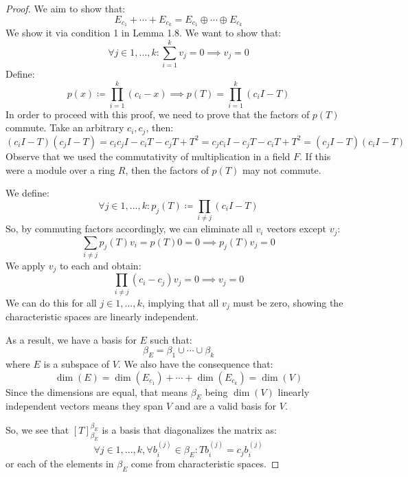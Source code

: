 \documentclass[10pt,letterpaper]{article} %
\begin{document}
\begin{proof}
We aim to show that:
\begin{equation*}
E_{c_1} + \cdots + E_{c_k} = E_{c_1} \oplus \cdots \oplus E_{c_k}
\end{equation*}
We show it via condition 1 in Lemma 1.8. We want to show that:
\begin{equation*}
\forall j \in 1, ..., k: \sum_{i=1}^k v_j = 0 \implies v_j = 0
\end{equation*}
Define:
\begin{equation*}
p(x) \coloneq \prod_{i=1}^{k}(c_i - x) \implies p(T) = \prod_{i=1}^{k}(c_iI - T)
\end{equation*}
In order to proceed with this proof, we need to prove that the factors of $p(T)$ commute. Take an arbitrary $c_i, c_j$, then:
\begin{equation*}
(c_iI - T)(c_jI - T) = c_ic_jI - c_iT - c_jT + T^2 = c_jc_iI - c_jT - c_iT + T^2 = (c_jI - T)(c_iI - T)
\end{equation*}
Observe that we used the commutativity of multiplication in a field $F$. If this were a module over a ring $R$, then the factors of $p(T)$ may not commute.

We define:
\begin{equation*}
\forall j \in 1, ..., k: p_j(T) \coloneq \prod_{i \neq j}(c_iI - T)
\end{equation*}
So, by commuting factors accordingly, we can eliminate all $v_i$ vectors except $v_j$:
\begin{equation*}
\sum_{i \neq j}p_j(T)v_i = p(T)0 = 0 \implies p_j(T)v_j = 0
\end{equation*}
We apply $v_j$ to each and obtain:
\begin{equation*}
\prod_{i \neq j}(c_i - c_j)v_j = 0 \implies v_j = 0
\end{equation*}
We can do this for all $j \in 1, ..., k$, implying that all $v_j$ must be zero, showing the characteristic spaces are linearly independent.

As a result, we have a basis for $E$ such that:
\begin{equation*}
\beta_E = \beta_1 \cup \cdots \cup \beta_k
\end{equation*}
where $E$ is a subspace of $V$. We also have the consequence that:
\begin{equation*}
\dim(E) = \dim(E_{c_1}) + \cdots + \dim(E_{c_k}) = \dim(V)
\end{equation*}
Since the dimensions are equal, that means $\beta_E$ being $\dim(V)$ linearly independent vectors means they span $V$ and are a valid basis for $V$.

So, we see that $[T]_{\beta_E}^{\beta_E}$ is a basis that diagonalizes the matrix as:
\begin{equation*}
\forall j \in 1, ..., k, \forall b_i^{(j)} \in \beta_E: Tb_i^{(j)} = c_jb_i^{(j)}
\end{equation*}
or each of the elements in $\beta_E$ come from characteristic spaces.
\end{proof}
\end{document}
